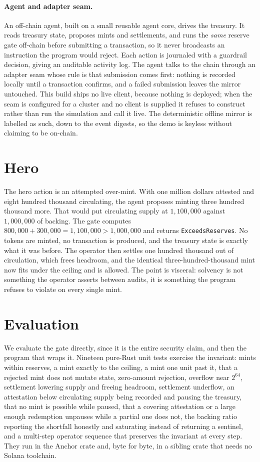 \documentclass[10pt,twocolumn]{article}
\begin{document}
\paragraph{Agent and adapter seam.} An off-chain agent, built on a small reusable
agent core, drives the treasury. It reads treasury state, proposes mints and
settlements, and runs the \emph{same} reserve gate off-chain before submitting a
transaction, so it never broadcasts an instruction the program would reject. Each
action is journaled with a guardrail decision, giving an auditable activity log.
The agent talks to the chain through an adapter seam whose rule is that submission
comes first: nothing is recorded locally until a transaction confirms, and a failed
submission leaves the mirror untouched. This build ships no live client, because
nothing is deployed; when the seam is configured for a cluster and no client is
supplied it refuses to construct rather than run the simulation and call it live.
The deterministic offline mirror is labelled as such, down to the event digests,
so the demo is keyless without claiming to be on-chain.

\section{Hero}
The hero action is an attempted over-mint. With one million dollars attested and
eight hundred thousand circulating, the agent proposes minting three hundred
thousand more. That would put circulating supply at $1{,}100{,}000$ against
$1{,}000{,}000$ of backing. The gate computes $800{,}000 + 300{,}000 = 1{,}100{,}000 >
1{,}000{,}000$ and returns \texttt{ExceedsReserves}. No tokens are minted, no
transaction is produced, and the treasury state is exactly what it was before. The
operator then settles one hundred thousand out of circulation, which frees
headroom, and the identical three-hundred-thousand mint now fits under the ceiling
and is allowed. The point is visceral: solvency is not something the operator
asserts between audits, it is something the program refuses to violate on every
single mint.

\section{Evaluation}
We evaluate the gate directly, since it is the entire security claim, and then the
program that wraps it. Nineteen pure-Rust unit tests exercise the invariant: mints
within reserves, a mint exactly to the ceiling, a mint one unit past it, that a
rejected mint does not mutate state, zero-amount rejection, overflow near $2^{64}$,
settlement lowering supply and freeing headroom, settlement underflow, an
attestation below circulating supply being recorded and pausing the treasury, that
no mint is possible while paused, that a covering attestation or a large enough
redemption unpauses while a partial one does not, the backing ratio reporting the
shortfall honestly and saturating instead of returning a sentinel, and a multi-step
operator sequence that preserves the invariant at every step. They run in the
Anchor crate and, byte for byte, in a sibling crate that needs no Solana toolchain.
\end{document}
